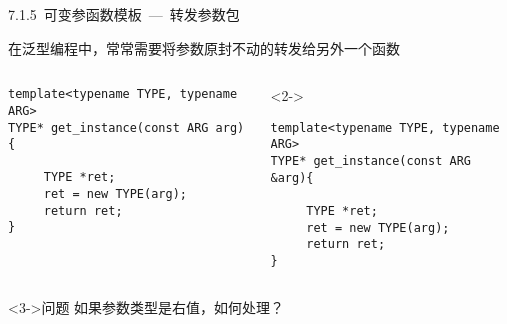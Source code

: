 \begin{frame}[fragile]{7.1.5~可变参函数模板\normalsize{~---~转发参数包}}
\begin{block}{在泛型编程中，常常需要将参数原封不动的转发给另外一个函数}
\begin{columns}
\begin{lstlisting}[moreemph={T}]
template<typename TYPE, typename ARG>
TYPE* get_instance(const ARG arg){

     TYPE *ret;
     ret = new TYPE(arg);
     return ret;
}
\end{lstlisting}
\begin{onlyenv}<2->
\begin{lstlisting}[moreemph={T}]
template<typename TYPE, typename ARG>
TYPE* get_instance(const ARG &arg){

     TYPE *ret;
     ret = new TYPE(arg);
     return ret;
}
\end{lstlisting}
\end{onlyenv}
\end{columns}
\end{block}

\begin{greenblock}<3->{问题}
如果参数类型是右值，如何处理？
\end{greenblock}
\end{frame}
